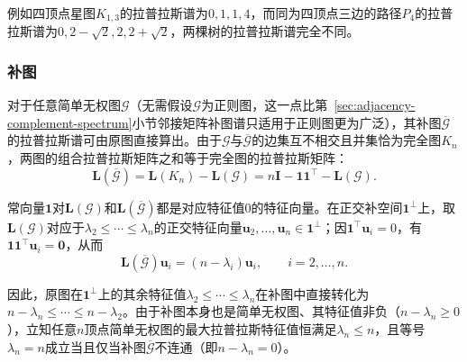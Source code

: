 例如四顶点星图$K_{1,3}$的拉普拉斯谱为$0,1,1,4$，而同为四顶点三边的路径$P_4$的拉普拉斯谱为$0,2-\sqrt 2,2,2+\sqrt 2$，两棵树的拉普拉斯谱完全不同。

\subsubsection{补图}
\label{sec:graph-complement-laplacian-spectrum}

对于任意简单无权图$\mathcal G$（无需假设$\mathcal G$为正则图，这一点比第~\ref{sec:adjacency-complement-spectrum}小节邻接矩阵补图谱只适用于正则图更为广泛），其补图$\overline{\mathcal G}$的拉普拉斯谱可由原图直接算出。由于$\mathcal G$与$\overline{\mathcal G}$的边集互不相交且并集恰为完全图$K_n$，两图的组合拉普拉斯矩阵之和等于完全图的拉普拉斯矩阵：
\begin{equation}
  \bm L(\overline{\mathcal G})
  =\bm L(K_n)-\bm L(\mathcal G)
  =n\bm I-\bm1\bm1^\top-\bm L(\mathcal G).
  \label{eq:graph-complement-laplacian}
\end{equation}

常向量$\bm 1$对$\bm L(\mathcal G)$和$\bm L(\overline{\mathcal G})$都是对应特征值$0$的特征向量。在正交补空间$\bm 1^\perp$上，取$\bm L(\mathcal G)$对应于$\lambda_2\leq\cdots\leq\lambda_n$的正交特征向量$\bm u_2,\ldots,\bm u_n\in\bm 1^\perp$；因$\bm 1^\top\bm u_i=0$，有$\bm 1\bm 1^\top\bm u_i=\bm 0$，从而
\[
  \bm L(\overline{\mathcal G})\bm u_i=(n-\lambda_i)\bm u_i,\qquad i=2,\ldots,n.
\]

因此，原图在$\bm1^\perp$上的其余特征值$\lambda_2\leq\cdots\leq\lambda_n$在补图中直接转化为$n-\lambda_n\leq\cdots\leq n-\lambda_2$。由于补图本身也是简单无权图、其特征值非负（$n-\lambda_n\geq 0$），立知任意$n$顶点简单无权图的最大拉普拉斯特征值恒满足$\lambda_n\leq n$，且等号$\lambda_n=n$成立当且仅当补图$\overline{\mathcal G}$不连通（即$n-\lambda_n=0$）。
